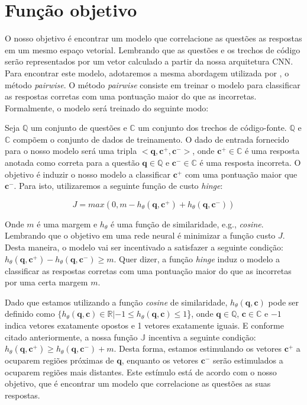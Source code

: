 \section{Função objetivo}
\label{sec:funcao-objetivo}

O nosso objetivo é encontrar um modelo que correlacione as questões as respostas em um mesmo espaço vetorial. Lembrando que as questões e os trechos de código serão representados por um vetor calculado a partir da nossa arquitetura CNN. Para encontrar este modelo, adotaremos a mesma abordagem utilizada por \cite{feng-2015}, o método \textit{pairwise}. O método \textit{pairwise} consiste em treinar o modelo para classificar as respostas corretas com uma pontuação maior do que as incorretas. Formalmente, o modelo será treinado do seguinte modo:

Seja $\mathbb{Q}$ um conjunto de questões e $\mathbb{C}$ um conjunto dos trechos de código-fonte. $\mathbb{Q}$ e $\mathbb{C}$ compõem o conjunto de dados de treinamento. O dado de entrada fornecido para o nosso modelo será uma tripla $<\bm{q}, \bm{c^{+}}, \bm{c^{-}}>$, onde $\bm{c^{+}} \in \mathbb{C}$ é uma resposta anotada como correta para a questão $\bm{q} \in \mathbb{Q}$ e $\bm{c^{-}} \in \mathbb{C}$ é uma resposta incorreta. O objetivo é induzir o nosso modelo a classificar $\bm{c^{+}}$ com uma pontuação maior que $\bm{c^{-}}$. Para isto, utilizaremos a seguinte função de custo \textit{hinge}:

\begin{equation}
J = max(0, m - h_{\theta}(\bm{q}, \bm{c^{+}}) + h_{\theta}(\bm{q}, \bm{c^{-}}))
\end{equation}

Onde $m$ é uma margem e $h_{\theta}$ é uma função de similaridade, e.g., \textit{cosine}. Lembrando que o objetivo em uma rede neural é minimizar a função custo $J$. Desta maneira, o modelo vai ser incentivado a satisfazer a seguinte condição: $h_{\theta}(\bm{q}, \bm{c^{+}}) - h_{\theta}(\bm{q}, \bm{c^{-}}) \geq m$. Quer dizer, a função \textit{hinge} induz o modelo a classificar as respostas corretas com uma pontuação maior do que as incorretas por uma certa margem $m$. 

Dado que estamos utilizando a função \textit{cosine} de similaridade, $h_{\theta}(\bm{q}, \bm{c})$ pode ser definido como $\{h_{\theta}(\bm{q}, \bm{c}) \in \mathbb{R} | -1 \leq h_{\theta}(\bm{q}, \bm{c}) \leq 1$\}, onde $\bm{q} \in \mathbb{Q}$, $\bm{c} \in \mathbb{C}$ e $-1$ indica vetores exatamente opostos e 1 vetores exatamente iguais. E conforme citado anteriormente, a nossa função $\mathbb{J}$ incentiva a seguinte condição: $h_{\theta}(\bm{q}, \bm{c^{+}}) \geq h_{\theta}(\bm{q}, \bm{c^{-}}) + m$. Desta forma, estamos estimulando os vetores $\bm{c^{+}}$ a ocuparem regiões próximas de $\bm{q}$, enquanto os vetores $\bm{c^{-}}$ serão estimulados a ocuparem regiões mais distantes. Este estímulo está de acordo com o nosso objetivo, que é encontrar um modelo que correlacione as questões as suas respostas.


